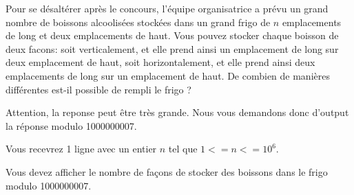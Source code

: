 \problemname{\problemyamlname}


Pour se désaltérer après le concours, l'équipe organisatrice a prévu un grand
nombre de boissons alcoolisées stockées dans un grand frigo de $n$ emplacements
de long et deux emplacements de haut.  Vous pouvez stocker chaque boisson de
deux facons: soit verticalement, et elle prend ainsi un emplacement de long sur
deux emplacement de haut, soit horizontalement, et elle prend ainsi deux
emplacements de long sur un emplacement de haut. De combien de manières
différentes est-il possible de rempli le frigo ? 

Attention, la reponse peut être très grande. Nous vous demandons donc d'output
la réponse modulo 1000000007.

\begin{Input}
    Vous recevrez 1 ligne avec un entier $n$ tel que $1 <= n <= 10^6$.   
\end{Input}

\begin{Output}
    Vous devez afficher le nombre de façons de stocker des boissons dans le frigo
modulo 1000000007.
\end{Output}
